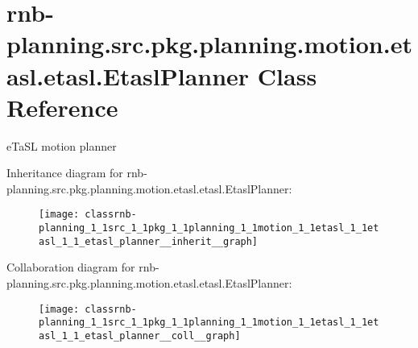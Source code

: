 \hypertarget{classrnb-planning_1_1src_1_1pkg_1_1planning_1_1motion_1_1etasl_1_1etasl_1_1_etasl_planner}{}\section{rnb-\/planning.src.\+pkg.\+planning.\+motion.\+etasl.\+etasl.\+Etasl\+Planner Class Reference}
\label{classrnb-planning_1_1src_1_1pkg_1_1planning_1_1motion_1_1etasl_1_1etasl_1_1_etasl_planner}


e\+Ta\+SL motion planner  




Inheritance diagram for rnb-\/planning.src.\+pkg.\+planning.\+motion.\+etasl.\+etasl.\+Etasl\+Planner\+:\nopagebreak
\begin{figure}[H]
\begin{center}
\leavevmode
\texttt{[image: classrnb-planning\_1\_1src\_1\_1pkg\_1\_1planning\_1\_1motion\_1\_1etasl\_1\_1etasl\_1\_1\_etasl\_planner\_\_inherit\_\_graph]}
\end{center}
\end{figure}


Collaboration diagram for rnb-\/planning.src.\+pkg.\+planning.\+motion.\+etasl.\+etasl.\+Etasl\+Planner\+:\nopagebreak
\begin{figure}[H]
\begin{center}
\leavevmode
\texttt{[image: classrnb-planning\_1\_1src\_1\_1pkg\_1\_1planning\_1\_1motion\_1\_1etasl\_1\_1etasl\_1\_1\_etasl\_planner\_\_coll\_\_graph]}
\end{center}
\end{figure}
